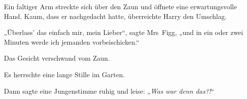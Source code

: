Ein faltiger Arm streckte sich über den Zaun und öffnete eine erwartungsvolle Hand. Kaum, dass er nachgedacht hatte, überreichte Harry den Umschlag.

„Überlass' das einfach mir, mein Lieber“, sagte Mrs~Figg, „und in ein oder zwei Minuten werde ich jemanden vorbeischicken.“

Das Gesicht verschwand vom Zaun.

Es herrschte eine lange Stille im Garten.

Dann sagte eine Jungenstimme ruhig und leise: „\emph{Was war denn das?!}“
